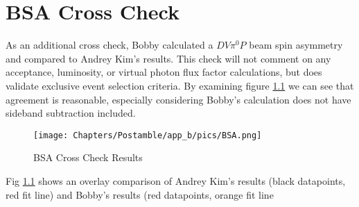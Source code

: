 \chapter{BSA Cross Check}

As an additional cross check, Bobby calculated a $DV\pi^0P$ beam spin asymmetry and compared to Andrey Kim's results. This check will not comment on any acceptance, luminosity, or virtual photon flux factor calculations, but does validate exclusive event selection criteria. By examining figure \ref{fig:bsa} we can see that agreement is reasonable, especially considering Bobby's calculation does not have sideband subtraction included.

\begin{figure}[hbt]
	\centering
	\texttt{[image: Chapters/Postamble/app\_b/pics/BSA.png]}
	
	
	\caption{BSA Cross Check Results}
	\label{fig:bsa}
\end{figure}

Fig \ref{fig:bsa} shows an overlay comparison of Andrey Kim's results (black datapoints, red fit line) and Bobby's results (red datapoints, orange fit line